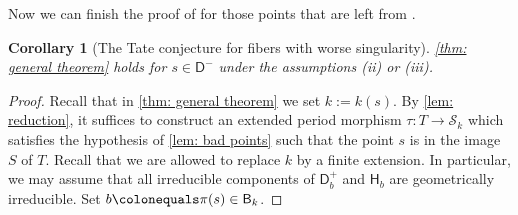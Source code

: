 \documentclass[11pt, letterpaper]{amsart}
\theoremstyle{plain}
\newtheorem{corollary}[theorem]{Corollary}
\theoremstyle{definition}
\newcommand{\<}{\langle}
\renewcommand{\>}{\rangle}
\newcommand{\shS}{\mathscr{S}}
\newcommand{\sfD}{\mathsf{D}}
\newcommand{\sfH}{\mathsf{H}}
\newcommand{\sfB}{\mathsf{B}}
\begin{document}
Now we can finish the proof of  for those points that are left from .
\begin{corollary}[The Tate conjecture for fibers with worse singularity]
\label{cor: bad points}
    \cref{thm: general theorem} holds for $s \in \sfD^-$ under the assumptions (ii) or (iii). 
\end{corollary}
\begin{proof}
    Recall that in \cref{thm: general theorem} we set $k:= k(s)$. By \cref{lem: reduction}, it suffices to construct an extended period morphism $\tau : T \to \shS_k$ which satisfies the hypothesis of \cref{lem: bad points} such that the point $s$ is in the image $S$ of $T$. 
    Recall that we are allowed to replace $k$ by a finite extension. 
    In particular, we may assume that all irreducible components of $\sfD^+_b$ and $\sfH_b$ are geometrically irreducible. Set $b \colonequals \pi(s) \in \sfB_k$. 


\end{proof}
\end{document}
